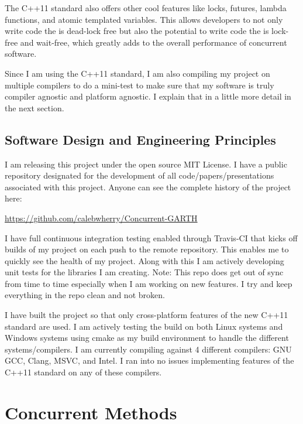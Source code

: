 \documentclass{acm_proc_article-sp}
\begin{document}
The C++11 standard also offers other cool features like locks, futures, lambda functions, and atomic templated variables. This allows developers to not only write code the is dead-lock free but also the potential to write code the is lock-free and wait-free, which greatly adds to the overall performance of concurrent software.

Since I am using the C++11 standard, I am also compiling my project on multiple compilers to do a mini-test to make sure that my software is truly compiler agnostic and platform agnostic. I explain that in a little more detail in the next section.


\subsection{Software Design and Engineering Principles}

I am releasing this project under the open source MIT License. I have a public repository designated for the development of all code/papers/presentations associated with this project. Anyone can see the complete history of the project here:

\url{https://github.com/calebwherry/Concurrent-GARTH}

I have full continuous integration testing enabled through Travis-CI that kicks off builds of my project on each push to the remote repository. This enables me to quickly see the health of my project. Along with this I am actively developing unit tests for the libraries I am creating. Note: This repo does get out of sync from time to time especially when I am working on new features. I try and keep everything in the repo clean and not broken.

I have built the project so that only cross-platform features of the new C++11 standard are used. I am actively testing the build on both Linux systems and Windows systems using cmake as my build environment to handle the different systems/compilers. I am currently compiling against 4 different compilers: GNU GCC, Clang, MSVC, and Intel. I ran into no issues implementing features of the C++11 standard on any of these compilers.


%
%
\section{Concurrent Methods}
\end{document}

